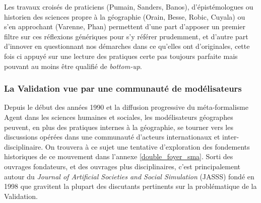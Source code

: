 Les travaux croisés de praticiens (Pumain, Sanders, Banos), d'épistémologues ou historien des sciences propre à la géographie (Orain, Besse, Robic, Cuyala) ou s'en approchant (Varenne, Phan) permettent d'une part d'apposer un premier filtre sur ces réflexions génériques pour s'y référer prudemment, et d'autre part d'innover en questionnant nos démarches dans ce qu'elles ont d'originales, cette fois ci appuyé sur une lecture des pratiques certe pas toujours parfaite mais pouvant au moins être qualifié de \textit{bottom-up}.





\subsubsection{La Validation vue par une communauté de modélisateurs}
\label{sssec:validation_modelisateurs}

Depuis le début des années 1990 et la diffusion progressive du méta-formalisme Agent \autocite{Treuil2008} dans les sciences humaines et sociales, les modélisateurs géographes peuvent, en plus des pratiques internes à la géographie, se tourner vers les discussions opérées dans une communauté d'acteurs internationaux et inter-disciplinaire. On trouvera à ce sujet une tentative d'exploration des fondements historiques de ce mouvement dans l'annexe \ref{double_foyer_sma}. Sorti des ouvrages fondateurs, et des ouvrages plus disciplinaires, c'est principalement autour du \textit{Journal of Artificial Societies and Social Simulation} (JASSS) fondé en 1998 que gravitent la plupart des discutants pertinents sur la problématique de la Validation.

